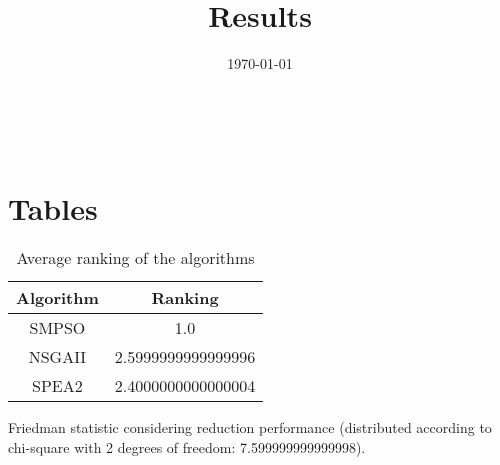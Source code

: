 \documentclass{article}
\title{Results}
\author{}
\date{\today}
\begin{document}
\oddsidemargin 0in \topmargin 0in\maketitle
\
\section{Tables}
\begin{table}[!htp]
\centering
\caption{Average ranking of the algorithms}
\begin{tabular}{c|c}
Algorithm&Ranking\\
\hline
SMPSO&1.0\\
NSGAII&2.5999999999999996\\
SPEA2&2.4000000000000004\\
\end{tabular}
\end{table}


Friedman statistic considering reduction performance (distributed according to chi-square with 2 degrees of freedom: 7.599999999999998).
\end{document}
